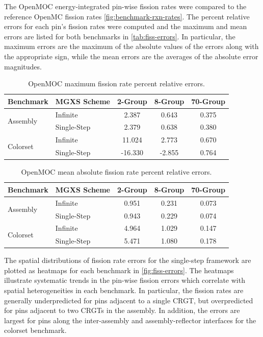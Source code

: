 The OpenMOC energy-integrated pin-wise fission rates were compared to the reference OpenMC fission rates \autoref{fig:benchmark-rxn-rates}. The percent relative errors for each pin's fission rates were computed and the maximum and mean errors are listed for both benchmarks in \autoref{tab:fiss-errors}. In particular, the maximum errors are the maximum of the absolute values of the errors along with the appropriate sign, while the mean errors are the averages of the absolute error magnitudes.

\begin{table}[h!]
  \centering
  \caption{OpenMOC maximum fission rate percent relative errors.}
  \label{tab:fiss-errors}
  \begin{tabular}{l l c c c}
  \toprule
  \textbf{Benchmark} & \textbf{MGXS Scheme} & \textbf{2-Group} & \textbf{8-Group} & \textbf{70-Group} \\
  \midrule
  \multirow{2}{*}{Assembly} & Infinite    & 2.387 & 0.643 & 0.375 \\
                            & Single-Step & 2.379 & 0.638 & 0.380 \\
  \midrule
  \multirow{2}{*}{Colorset} & Infinite    &  11.024 &  2.773 & 0.670 \\
                            & Single-Step & -16.330 & -2.855 & 0.764 \\
  \bottomrule
\end{tabular}
\end{table}

\begin{table}[h!]
  \centering
  \caption{OpenMOC mean absolute fission rate percent relative errors.}
  \label{tab:fiss-errors}
  \begin{tabular}{l l c c c}
  \toprule
  \textbf{Benchmark} & \textbf{MGXS Scheme} & \textbf{2-Group} & \textbf{8-Group} & \textbf{70-Group} \\
  \midrule
  \multirow{2}{*}{Assembly} & Infinite    & 0.951 & 0.231 & 0.073 \\
                            & Single-Step & 0.943 & 0.229 & 0.074 \\
  \midrule
  \multirow{2}{*}{Colorset} & Infinite    & 4.964 & 1.029 & 0.147 \\
                            & Single-Step & 5.471 & 1.080 & 0.178 \\
  \bottomrule
\end{tabular}
\end{table}

The spatial distributions of fission rate errors for the single-step framework are plotted as heatmaps for each benchmark in \autoref{fig:fiss-errors}. The heatmaps illustrate systematic trends in the pin-wise fission errors which correlate with spatial heterogeneities in each benchmark. In particular, the fission rates are generally underpredicted for pins adjacent to a single CRGT, but overpredicted for pins adjacent to two CRGTs in the assembly. In addition, the errors are largest for pins along the inter-assembly and assembly-reflector interfaces for the colorset benchmark.


